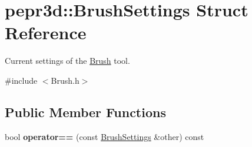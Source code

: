 \hypertarget{structpepr3d_1_1_brush_settings}{}\section{pepr3d\+::Brush\+Settings Struct Reference}
\label{structpepr3d_1_1_brush_settings}


Current settings of the \mbox{\hyperlink{classpepr3d_1_1_brush}{Brush}} tool.  




{\ttfamily \#include $<$Brush.\+h$>$}

\subsection*{Public Member Functions}
\begin{DoxyCompactItemize}
\item 
\mbox{\label{structpepr3d_1_1_brush_settings_a8ad6fcd04c952660c50cf80bcf9db233}} 
bool {\bfseries operator==} (const \mbox{\hyperlink{structpepr3d_1_1_brush_settings}{Brush\+Settings}} \&other) const
\end{DoxyCompactItemize}
